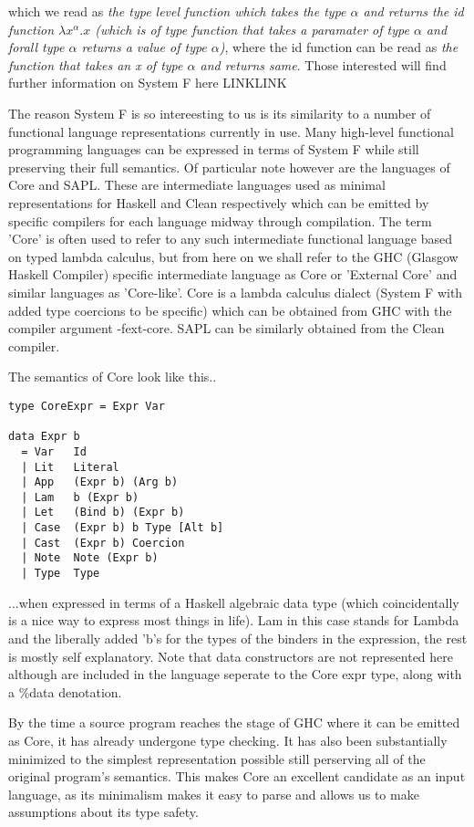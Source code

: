 \documentclass[11pt]{article}
\begin{document}
\noindent which we read as \emph{the type level function which takes 
the type \(\alpha\) and returns the id function \( \lambda x^\alpha . x \)
(which is of type \emph{ function that takes a paramater of type \( \alpha \) 
and forall type \(\alpha\) returns a value of type \( \alpha \)})}, where 
the id function can be read as \emph{the function that takes an x of 
type \( \alpha \) and returns same}. Those interested will find further information
on System F here LINKLINK

The reason System F is so intereesting to us is its similarity to a number of functional
language representations currently in use. Many high-level functional programming languages
can be expressed in terms of System F while still preserving their full semantics. Of
particular note however are the languages of Core and SAPL. These are intermediate languages
used as minimal representations for Haskell and Clean respectively which can be emitted by
specific compilers for each language midway through compilation. The term 'Core' is often
used to refer to any such intermediate functional language based on typed lambda calculus,
but from here on we shall refer to the GHC (Glasgow Haskell Compiler) specific intermediate
language as Core or 'External Core' and similar languages as 'Core-like'. Core is a lambda
calculus dialect (System F with added type coercions to be specific) which can be obtained
from GHC with the compiler argument -fext-core. SAPL can be similarly obtained from the 
Clean compiler. 


\noindent The semantics of Core look like this..

\begin{verbatim}
type CoreExpr = Expr Var

data Expr b 
  = Var	  Id
  | Lit   Literal
  | App   (Expr b) (Arg b)
  | Lam   b (Expr b)
  | Let   (Bind b) (Expr b)
  | Case  (Expr b) b Type [Alt b]
  | Cast  (Expr b) Coercion
  | Note  Note (Expr b)
  | Type  Type
\end{verbatim}

\noindent ...when expressed in terms of a Haskell algebraic data type (which 
coincidentally is a nice way to express most things in life). Lam in this
case stands for Lambda and the liberally added 'b's for the types of the binders
in the expression, the rest is mostly self explanatory. Note that data constructors
are not represented here although are included in the language seperate to the
Core expr type, along with a \%data denotation.

By the time a source program reaches the stage of GHC where it can be emitted
as Core, it has already undergone type checking. It has also been substantially 
minimized to the simplest representation
possible still perserving all of the original program's semantics. This makes
Core an excellent candidate as an input language, as its minimalism makes it
easy to parse and allows us to make assumptions about its type safety.
\end{document}

